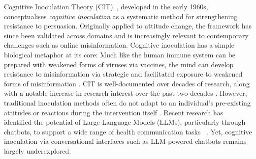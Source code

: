 \documentclass[sigconf]{acmart}
\begin{document}

Cognitive Inoculation Theory (CIT)~\cite{McGuire_1961,Banas_Rains_2010}, developed in the early 1960s, conceptualises \textit{cognitive inoculation} as a systematic method for strengthening resistance to persuasion.
Originally applied to attitude change, the framework has since been validated across domains and is increasingly relevant to contemporary challenges such as online misinformation.
Cognitive inoculation has a simple biological metaphor at its core: Much like the human immune system can be prepared with weakened forms of viruses via vaccines, the mind can develop resistance to misinformation via strategic and facilitated exposure to weakened forms of misinformation \cite{Banas_Rains_2010}.
CIT %
is well-documented over decades of research, along with a notable increase in research interest over the past two decades \cite{Compton_2024, Banas_Rains_2010}. 
However, traditional inoculation methods often do not adapt to an individual's pre-existing attitudes or reactions during the intervention itself \cite{Zarzosa_Ruvalcaba_2025}.
Recent research has identified the potential of Large Language Models (LLMs), particularly through chatbots, to support a wide range of health communication tasks
~\cite{Passanante_Pertwee_Lin_Lee_Wu_Larson_2023, wei2024leveraging}.
Yet, cognitive inoculation via conversational interfaces such as LLM-powered chatbots remains largely underexplored.
\end{document}
